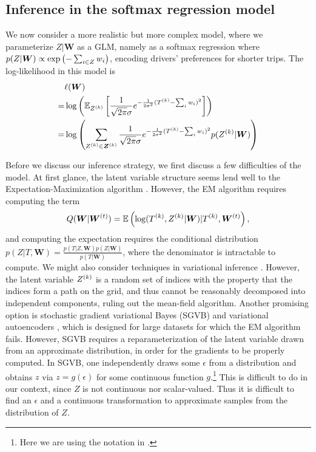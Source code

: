 \documentclass{article}
\begin{document}
 
\subsection{Inference in the softmax regression model}

We now consider a more realistic but more complex model, where we parameterize $Z|\bm W$ as a GLM, namely as a softmax regression where $p(Z|\bm W) \propto \exp\left({-\sum_{i\in Z}w_i}\right)$, encoding drivers' preferences for shorter trips. The log-likelihood in this model is \begin{align*}
& \ell(\bm W) \\
=& \log\left({\mathbb{E}_{Z^{(k)}}\left[{\frac{1}{\sqrt{2\pi}\sigma} e^{-\frac{1}{2\sigma^2}(T^{(k)} - \sum_i w_i)^2}}\right]}\right)\\
=& \log\left({\sum_{Z^{(k)}\in \bm Z^{(k)}} \frac{1}{\sqrt{2\pi}\sigma} e^{-\frac{1}{2\sigma^2}(T^{(k)} - \sum_i w_i)^2} p(Z^{(k)}|\bm W)}\right)
\end{align*}

Before we discuss our inference strategy, we first discuss a few difficulties of the model. At first glance, the latent variable structure seems lend well to the Expectation-Maximization algorithm \cite{dempster1977maximum}. However, the EM algorithm requires computing the term \[
Q(\bm W|\bm W^{(t)}) = \mathbb{E}\left({\log(T^{(k)}, Z^{(k)} | \bm W) | T^{(k)}, \bm W^{(t)}}\right),
\]
and computing the expectation requires the conditional distribution $p(Z | T, \bm W) = \frac{p(T|Z,\bm W)p(Z|\bm W)}{p(T|\bm W)}$, where the denominator is intractable to compute. We might also consider techniques in variational inference \cite{blei2017variational}. However, the latent variable $Z^{(k)}$ is a random set of indices with the property that the indices form a path on the grid, and thus cannot be reasonably decomposed into independent components, ruling out the mean-field algorithm. Another promising option is stochastic gradient variational Bayes (SGVB) and variational autoencoders \cite{kingma2013auto}, which is designed for large datasets for which the EM algorithm fails. However, SGVB requires a reparameterization of the latent variable drawn from an approximate distribution, in order for the gradients to be properly computed. In SGVB, one independently draws some $\epsilon$ from a distribution and obtains $z$ via $z = g(\epsilon)$ for some continuous function $g$.\footnote{Here we are using the notation in \cite{kingma2013auto}.} This is difficult to do in our context, since $Z$ is not continuous nor scalar-valued. Thus it is difficult to find an $\epsilon$ and a continuous transformation to approximate samples from the distribution of $Z$.  
\end{document}
